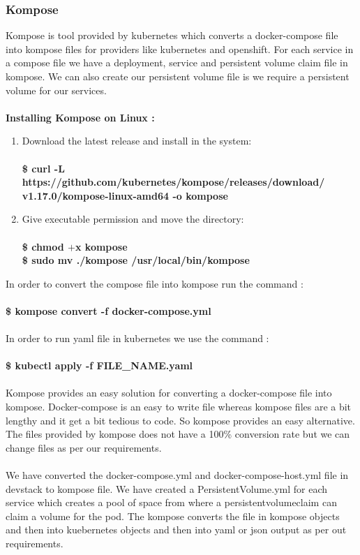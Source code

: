 \documentclass[12pt]{article}
\begin{document}
\subsubsection{Kompose}
Kompose is tool provided by kubernetes which converts a docker-compose file into kompose files for providers like kubernetes and openshift. For each service in a compose file we have a deployment, service and persistent volume claim file in kompose. We can also create our persistent volume file is we require a persistent volume for our services.\\\\
\textbf{Installing Kompose on Linux :}
\begin{enumerate}
	\item Download the latest release and install in the system:\\\\
	\textbf{\$ curl -L https://github.com/kubernetes/kompose/releases/download/\\v1.17.0/kompose-linux-amd64 -o kompose}
	\item Give executable permission and move the directory:\\\\
	\textbf{\$ chmod $+$x kompose\\
			\$ sudo mv ./kompose /usr/local/bin/kompose}
\end{enumerate}
In order to convert the compose file into kompose run the command :\\\\
\textbf{\$ kompose convert -f docker-compose.yml}\\\\
In order to run yaml file in kubernetes we use the command :\\\\
\textbf{\$ kubectl apply -f FILE\_NAME.yaml}\\\\
Kompose provides an easy solution for  converting a docker-compose file into kompose. Docker-compose is an easy to write file whereas kompose files are a bit lengthy and it get a bit tedious to code. So kompose provides an easy alternative. The files provided by kompose does not have a 100\% conversion rate but we can change files as per our requirements.\\\\
We have converted the docker-compose.yml and docker-compose-host.yml file in devstack to kompose file. We have created a PersistentVolume.yml for each service which creates a pool of space from where a persistentvolumeclaim can claim a volume for the pod. The kompose converts the file in kompose objects and then into kuebernetes objects and then into yaml or json output as per out requirements.
\end{document}
